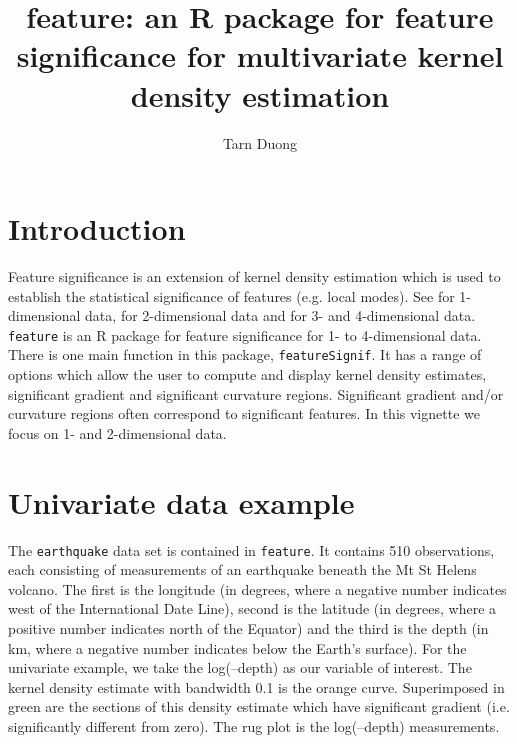 \documentclass[a4paper,11pt]{article}
\title{feature: an R package for feature significance for multivariate
kernel density estimation}
\author{Tarn Duong}
\begin{document}
\maketitle

\section{Introduction}

Feature significance is an extension of kernel density estimation
which is used to establish the statistical significance of 
features (e.g. local modes). See \citet*{chaudhuri99} for 1-dimensional data,
\citet*{godtliebsen02} for  2-dimensional data and \citet*{duong07}
for 3- and 4-dimensional data. \texttt{feature} is an R package for 
feature significance for 1- to 4-dimensional data.
  There is one main function in this package, \texttt{featureSignif}. 
It has a range of options which allow
the user to compute and display kernel density estimates, significant gradient
and significant curvature regions. Significant gradient and/or
curvature regions often correspond to significant features. 
In this vignette we focus on 1- and 2-dimensional data.


\section{Univariate data example}
The \texttt{earthquake} data set is contained in 
\texttt{feature}. It contains 510 observations, each consisting
of measurements of an earthquake beneath the Mt St Helens volcano.
The first is the longitude (in degrees, where a negative number
indicates west of the International Date Line), second  is
the latitude (in degrees, where a positive number indicates north of
the Equator) and the third  is the depth (in km, where a
negative number indicates below the Earth's surface).
For the univariate example, we take the log(--depth)
as our variable of interest. 
The kernel density estimate with bandwidth 0.1 is the orange curve. 
Superimposed in green 
are the sections of this density estimate which have significant gradient
(i.e. significantly different from zero). The rug plot is 
the log(--depth) measurements.
\end{document}
